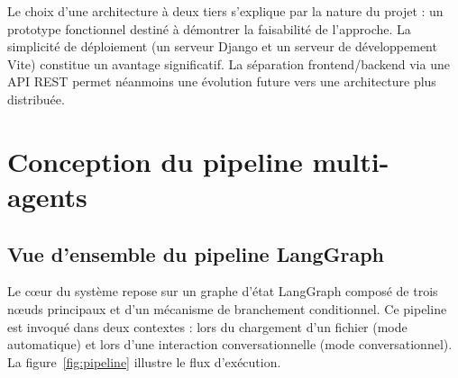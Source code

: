 Le choix d'une architecture à deux tiers s'explique par la nature du projet : un prototype fonctionnel destiné à démontrer la faisabilité de l'approche. La simplicité de déploiement (un serveur Django et un serveur de développement Vite) constitue un avantage significatif. La séparation frontend/backend via une API REST permet néanmoins une évolution future vers une architecture plus distribuée.

\section{Conception du pipeline multi-agents}

\subsection{Vue d'ensemble du pipeline LangGraph}

Le cœur du système repose sur un graphe d'état LangGraph composé de trois nœuds principaux et d'un mécanisme de branchement conditionnel. Ce pipeline est invoqué dans deux contextes : lors du chargement d'un fichier (mode automatique) et lors d'une interaction conversationnelle (mode conversationnel). La figure~\ref{fig:pipeline} illustre le flux d'exécution.


